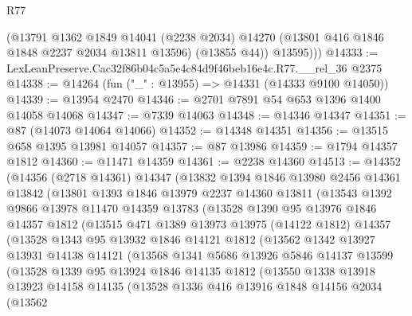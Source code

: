 \begin{lexlean}{R77}
\begin{coremodule}
          (@13791
            @1362
            @1849
            @14041
            (@2238 @2034)
            @14270
            (@13801 @416 @1846 @1848 @2237 @2034 @13811 @13596)
            (@13855 @44))
          @13595)))
@14333 := LexLeanPreserve.Cac32f86b04c5a5e4c84d9f46beb16e4c.R77.__rel_36 @2375
@14338 := @14264 (fun ("_" : @13955) => @14331 (@14333 @9100 @14050))
@14339 := @13954 @2470
@14346 := @2701 @7891 @54 @653 @1396 @1400 @14058 @14068
@14347 := @7339 @14063
@14348 := @14346 @14347
@14351 := @87 (@14073 @14064 @14066)
@14352 := @14348 @14351
@14356 := @13515 @658 @1395 @13981 @14057
@14357 := @87 @13986
@14359 := @1794 @14357 @1812
@14360 := @11471 @14359
@14361 := @2238 @14360
@14513 := @14352
    (@14356
      (@2718 @14361)
      @14347
      (@13832
        @1394
        @1846
        @13980
        @2456
        @14361
        @13842
        (@13801
          @1393
          @1846
          @13979
          @2237
          @14360
          @13811
          (@13543
            @1392
            @9866
            @13978
            @11470
            @14359
            @13783
            (@13528
              @1390
              @95
              @13976
              @1846
              @14357
              @1812
              (@13515
                @471
                @1389
                @13973
                @13975
                (@14122 @1812)
                @14357
                (@13528
                  @1343
                  @95
                  @13932
                  @1846
                  @14121
                  @1812
                  (@13562
                    @1342
                    @13927
                    @13931
                    @14138
                    @14121
                    (@13568
                      @1341
                      @5686
                      @13926
                      @5846
                      @14137
                      @13599
                      (@13528
                        @1339
                        @95
                        @13924
                        @1846
                        @14135
                        @1812
                        (@13550
                          @1338
                          @13918
                          @13923
                          @14158
                          @14135
                          (@13528
                            @1336
                            @416
                            @13916
                            @1848
                            @14156
                            @2034
                            (@13562

\end{coremodule}
\end{lexlean}
